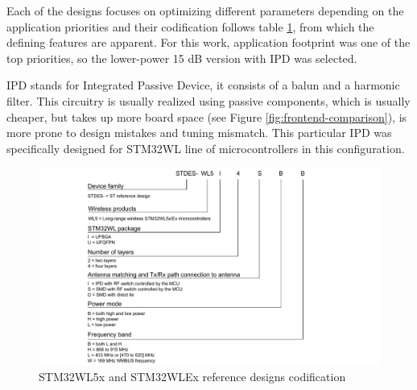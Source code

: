 Each of the designs focuses on optimizing different parameters depending on the application priorities and their codification follows table \ref{fig:reference-design-codification}, from which the defining features are apparent. For this work, application footprint was one of the top priorities, so the lower-power 15 dB version with IPD was selected.

IPD stands for Integrated Passive Device, it consists of a balun and a harmonic filter. This circuitry is usually realized using passive components, which is usually cheaper, but takes up more board space (see Figure \ref{fig:frontend-comparison}), is more prone to design mistakes and tuning mismatch. This particular IPD was specifically designed for STM32WL line of microcontrollers in this configuration.

\begin{figure}
    \includegraphics[width=\textwidth]{fig/STDES-xxxxxxx.png}
    \caption{\label{fig:reference-design-codification} STM32WL5x and STM32WLEx reference designs codification}
\end{figure}

